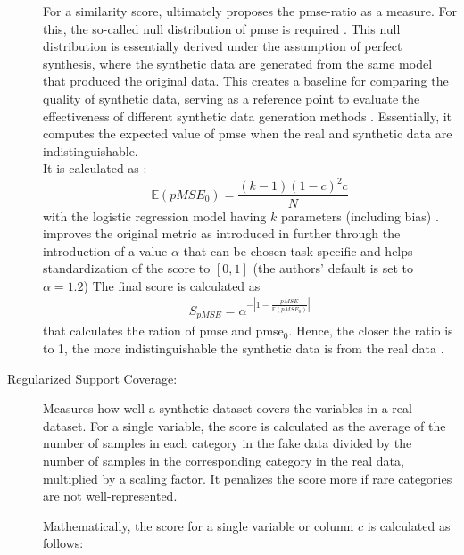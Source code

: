 \begin{description}
  For a similarity score, \textcite{snoke2018GeneralSpecificUtility} ultimately proposes the \gls{pmse}-ratio as a measure.
  For this, the so-called null distribution of \gls{pmse} is required \cite[p. 668]{snoke2018GeneralSpecificUtility}.
  This null distribution is essentially derived under the assumption of perfect synthesis, where the synthetic data are generated from the same model that produced the original data. 
  This creates a baseline for comparing the quality of synthetic data, serving as a reference point to evaluate the effectiveness of different synthetic data generation methods \cite{snoke2018GeneralSpecificUtility}.
  Essentially, it computes the expected value of \gls{pmse} when the real and synthetic data are indistinguishable.\\
  It is calculated as \cite{snoke2018GeneralSpecificUtility,chundawat2022UniversalMetricRobust}:
  $$\mathbb{E}(pMSE_0) = \frac{(k-1)(1-c)^2c}{N}$$
  with the logistic regression model having $k$ parameters (including bias) \cite{chundawat2022UniversalMetricRobust}.
  \cite{chundawat2022UniversalMetricRobust} improves the original metric as introduced in \cite{snoke2018GeneralSpecificUtility} further through the introduction
  of a value $\alpha$ that can be chosen task-specific and helps standardization of the score to $[0,1]$ (the authors' default is set to $\alpha=1.2$)
  The final score is calculated as 
  \begin{equation}
    \begin{align*}
      \label{eqn:s_pmse}
      S_{pMSE} = \alpha^{-|1-\frac{pMSE}{\mathbb{E}(pMSE_0)}|}
      \end{align*}
  \end{equation}
  that calculates the ration of \gls{pmse} and \gls{pmse}$_0$.
  Hence, the closer the ratio is to 1, the more indistinguishable the synthetic data is from the real data \cite{chundawat2022UniversalMetricRobust}.
  

  \item[Regularized Support Coverage:]
  Measures how well a synthetic dataset covers the variables in a real dataset. 
  For a single variable, the score is calculated as the average of the number of samples in each category in the fake data 
  divided by the number of samples in the corresponding category in the real data, multiplied by a scaling factor. 
  It penalizes the score more if rare categories are not well-represented. 
  
  Mathematically, the score for a single variable or column $c$ is calculated as follows:


\end{description}
